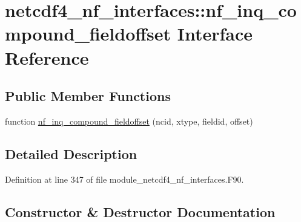 \hypertarget{interfacenetcdf4__nf__interfaces_1_1nf__inq__compound__fieldoffset}{}\section{netcdf4\+\_\+nf\+\_\+interfaces\+:\+:nf\+\_\+inq\+\_\+compound\+\_\+fieldoffset Interface Reference}
\label{interfacenetcdf4__nf__interfaces_1_1nf__inq__compound__fieldoffset}
\subsection*{Public Member Functions}
\begin{DoxyCompactItemize}
\item 
function \hyperlink{interfacenetcdf4__nf__interfaces_1_1nf__inq__compound__fieldoffset_ab427c21a1b779acbcba9d5aedebf4409}{nf\+\_\+inq\+\_\+compound\+\_\+fieldoffset} (ncid, xtype, fieldid, offset)
\end{DoxyCompactItemize}


\subsection{Detailed Description}


Definition at line 347 of file module\+\_\+netcdf4\+\_\+nf\+\_\+interfaces.\+F90.



\subsection{Constructor \& Destructor Documentation}
\mbox{\label{interfacenetcdf4__nf__interfaces_1_1nf__inq__compound__fieldoffset_ab427c21a1b779acbcba9d5aedebf4409}} 
